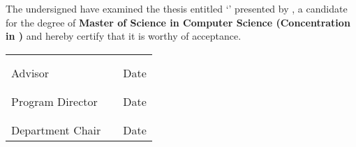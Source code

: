 \noindent
The undersigned have examined the thesis entitled `\textbf{\paperTitle}' presented by \textbf{\paperAuthor}, a candidate for the degree of \textbf{Master of Science in Computer Science (Concentration in \authorConcentration)} and hereby certify that it is worthy of acceptance.

\begin{center}
  \begin{tabularx}{1\textwidth} {
    >{\raggedright\arraybackslash}X
    m{1cm}
    m{3cm}
  }
    & & \\ & & \\ %
    \cline{1-1} \cline{3-3}
    Advisor & & Date \\
    
    & & \\ & & \\ %
    \cline{1-1} \cline{3-3}
    Program Director & & Date \\
    
    & & \\ & & \\ %
    \cline{1-1} \cline{3-3}
    Department Chair & & Date 
  \end{tabularx}
\end{center}
